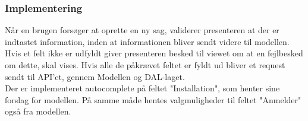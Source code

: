 	\pagebreak
	
	\subsubsection{Implementering}
	Når en brugen forsøger at oprette en ny sag, validerer presenteren at der er indtastet information, inden at informationen bliver sendt videre til modellen. Hvis et felt ikke er udfyldt giver presenteren besked til viewet om at en fejlbesked om dette, skal vises. Hvis alle de påkrævet feltet er fyldt ud bliver et request sendt til API'et, gennem Modellen og DAL-laget.
	\\Der er implementeret autocomplete på feltet "Installation", som henter sine forslag for modellen. På samme måde hentes valgmuligheder til feltet "Anmelder" også fra modellen. \\